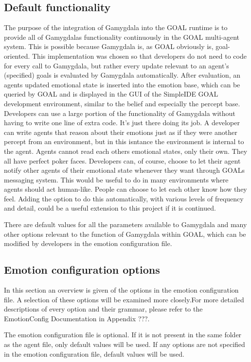 \documentclass[11pt]{article}
\begin{document}
\subsection{Default functionality}
The purpose of the integration of Gamygdala into the GOAL runtime is to provide all of Gamygdalas functionality continuously in the GOAL multi-agent system. This is possible because Gamygdala is, as GOAL obviously is, goal-oriented. This implementation was chosen so that developers do not need to code for every call to Gamygdala, but rather every update relevant to an agent's (specified) goals is evaluated by Gamygdala automatically. After evaluation, an agents updated emotional state is inserted into the emotion base, which can be queried by GOAL and is displayed in the GUI of the SimpleIDE GOAL development environment, similar to the belief and especially the percept base. Developers can use a large portion of the functionality of Gamygdala without having to write one line of extra code. It's just there doing its job. A developer can write agents that reason about their emotions just as if they were another percept from an environment, but in this isntance the environment is internal to the agent. Agents cannot read each others emotional states, only their own. They all have perfect poker faces. Developers can, of course, choose to let their agent notify other agents of their emotional state whenever they want through GOALs messaging system. This would be useful to do in many environments where agents should act human-like. People can choose to let each other know how they feel. Adding the option to do this automatically, with various levels of frequency and detail, could be a useful extension to this project if it is continued.

There are default values for all the parameters available to Gamygdala and many other options relevant to the function of Gamygdala within GOAL, which can be modified by developers in the emotion configuration file.


\subsection{Emotion configuration options}
In this section an overview is given of the options in the emotion configuration file. A selection of these options will be examined more closely.For more detailed descriptions of every option and their grammar, please refer to the EmotionConfig Documentation in Appendix ???. 

The emotion configuration file is optional. If it is not present in the same folder as the agent file, only default values will be used. If any options are not specified in the emotion configuration file, default values will be used.
\end{document}
